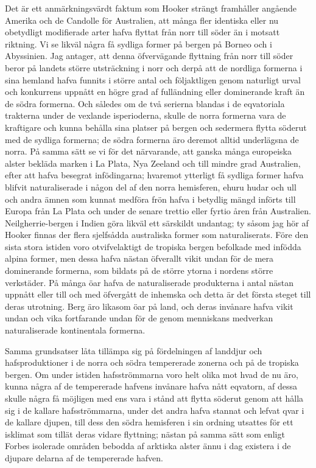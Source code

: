 Det är ett anmärkningsvärdt faktum som Hooker strängt framhåller angående Amerika och de Candolle för Australien, att många fler identiska eller nu obetydligt modifierade arter hafva flyttat från norr till söder än i motsatt riktning. Vi se likväl några få sydliga former på bergen på Borneo och i Abyssinien. Jag antager, att denna öfvervägande flyttning från norr till söder beror på landets större utsträckning i norr och derpå att de nordliga formerna i sina hemland hafva funnits i större antal och följaktligen genom naturligt urval och konkurrens uppnått en högre grad af fulländning eller dominerande kraft än de södra formerna. Och således om de två serierna blandas i de eqvatoriala trakterna under de vexlande isperioderna, skulle de norra formerna vara de kraftigare och kunna behålla sina platser på bergen och sedermera flytta söderut med de sydliga formerna; de södra formerna äro deremot alltid underlägsna de norra. På samma sätt se vi för det närvarande, att ganska många europeiska alster bekläda marken i La Plata, Nya Zeeland och till mindre grad Australien, efter att hafva besegrat infödingarna; hvaremot ytterligt få sydliga former hafva blifvit naturaliserade i någon del af den norra hemisferen, ehuru hudar och ull och andra ämnen som kunnat medföra frön hafva i betydlig mängd införts till Europa från La Plata och under de senare trettio eller fyrtio åren från Australien. Neilgherrie-bergen i Indien göra likväl ett särskildt undantag; ty såsom jag hör af Hooker finnas der flera sjelfsådda australiska former som naturaliserats. Före den sista stora istiden voro otvifvelaktigt de tropiska bergen befolkade med infödda alpina former, men dessa hafva nästan öfverallt vikit undan för de mera dominerande formerna, som bildats på de större ytorna i nordens större verkstäder. På många öar hafva de naturaliserade produkterna i antal nästan uppnått eller till och med öfvergått de inhemska och detta är det första steget till deras utrotning. Berg äro likasom öar på land, och deras invånare hafva vikit undan och vika fortfarande undan för de genom menniskans medverkan naturaliserade kontinentala formerna.

Samma grundsatser låta tillämpa sig på fördelningen af landdjur och hafsproduktioner i de norra och södra tempererade zonerna och på de tropiska bergen. Om under istiden hafsströmmarna voro helt olika mot hvad de nu äro, kunna några af de tempererade hafvens invånare hafva nått eqvatorn, af dessa skulle några få möjligen med ens vara i stånd att flytta söderut genom att hålla sig i de kallare hafsströmmarna, under det andra hafva stannat och lefvat qvar i de kallare djupen, till dess den södra hemisferen i sin ordning utsattes för ett isklimat som tillät deras vidare flyttning; nästan på samma sätt som enligt Forbes isolerade områden bebodda af arktiska alster ännu i dag existera i de djupare delarna af de tempererade hafven.

